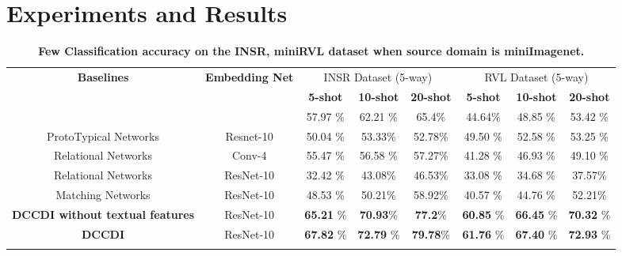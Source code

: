 \vspace{-0.5cm}
\section{Experiments and Results}

\begin{table*}[ht]
{\small
\centering
\begin{tabular}{cccccccc}
\toprule
     \multirow{3}{*}{\textbf{Baselines}} &   \multirow{3}{*}{\textbf{ Embedding Net }} & \multicolumn{3}{c}{INSR Dataset (5-way)}&\multicolumn{3}{c}{RVL Dataset (5-way)}\\
        & & \textbf{ 5-shot} & \textbf{10-shot} & \textbf{20-shot}  & \textbf{5-shot} & \textbf{10-shot} & \textbf{20-shot}\\
\midrule
ProtoTypical Networks & Conv-4 & 57.97 \% & 62.21  \% & 65.4\% &44.64\% &48.85 \% & 53.42 \% \\
ProtoTypical Networks & Resnet-10 & 50.04 \% & 53.33\% & 52.78\% & 49.50 \% & 52.58 \% & 53.25 \%\\
Relational Networks   & Conv-4 & 55.47  \% &  56.58 \% & 57.27\%  & 41.28  \% & 46.93 \% & 49.10 \%\\
Relational Networks   & ResNet-10 & 32.42  \% & 43.08\% & 46.53\%  & 33.08  \% & 34.68 \% &  37.57\% \\
Matching Networks      & ResNet-10 & 48.53  \% & 50.21\%&58.92\%& 40.57  \% & 44.76 \% & 52.21\%\\
\textbf{DCCDI without textual features}          & ResNet-10& \textbf{65.21} \% & \textbf{70.93}\% & \textbf{77.2}\% & \textbf{60.85} \% & \textbf{66.45} \% & \textbf{70.32} \%\\
\textbf{DCCDI} & ResNet-10 & \textbf{67.82} \% & \textbf{72.79} \% &\textbf{79.78}\% &\textbf{61.76} \% & \textbf{67.40} \% & \textbf{72.93 }\%\\
                \addlinespace[1ex]
            \hline
\bottomrule
\end{tabular}
\caption{\textbf{Few Classification accuracy on the INSR, miniRVL dataset when source domain is miniImagenet.}}
\label{tab:miniImageNet}

\bigskip

}
\end{table*}
